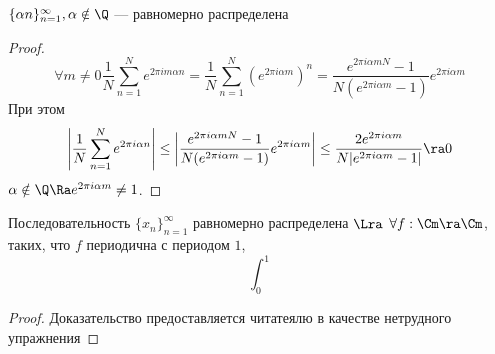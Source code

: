 \begin{proposition}
    \(\{\alpha n\}_{n = 1}^\infty, \alpha \notin \Q\) --- равномерно распределена
\end{proposition}
\begin{proof}
    \[\forall m \ne 0 \frac{1}{N}\sum_{n = 1}^N e^{2\pi i m \alpha n} = \frac{1}{N} \sum_{n = 1}^N\left(e^{2 \pi i \alpha m}\right)^n = \frac{e^{2\pi i \alpha m N} - 1}{N(e^{2 \pi i \alpha m} - 1)}e^{2 \pi i \alpha m}\]
    При этом 
    \[\left|\frac{1}{N}\sum_{n = 1}^N e^{2\pi i \alpha n}\right| \le \left|\frac{e^{2\pi i \alpha m N} - 1}{N(e^{2 \pi i \alpha m} - 1)}e^{2 \pi i \alpha m}\right| \le \frac{2e^{2 \pi i \alpha m}}{N|e^{2\pi i\alpha m} - 1|} \ra 0\]
    \(\alpha \notin \Q \Ra e^{2\pi i \alpha m} \ne 1\).
\end{proof}

\begin{theorem}
    Последовательность \(\{x_n\}_{n = 1}^\infty\) равномерно распределена \(\Lra\) \(\forall f: \Cm \ra \Cm\), таких, что \(f\) периодична с периодом \(1\), 
    \[\int_0^1\]
\end{theorem}
\begin{proof}
    Доказательство предоставляется читатеялю в качестве нетрудного упражнения
\end{proof}